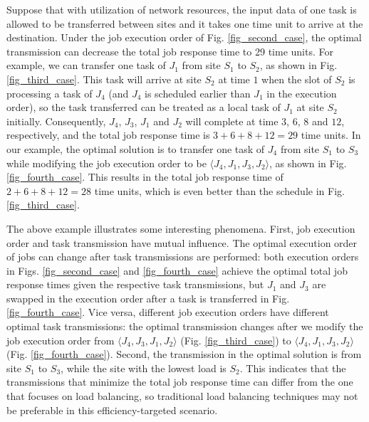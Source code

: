 Suppose that with utilization of network resources, the input data of one task is allowed to be transferred between sites and it takes one time unit to arrive at the destination. Under the job execution order of Fig. \ref{fig_second_case}, the optimal transmission can decrease the total job response time to 29 time units. For example, we can transfer one task of $J_1$ from site $S_1$ to $S_2$, as shown in Fig. \ref{fig_third_case}. This task will arrive at site $S_2$ at time $1$ when the slot of $S_2$ is processing a task of $J_4$ (and $J_4$ is scheduled earlier than $J_1$ in the execution order), so the task transferred can be treated as a local task of $J_1$ at site $S_2$ initially. Consequently, $J_4$, $J_3$, $J_1$ and $J_2$ will complete at time $3$, $6$, $8$ and $12$, respectively, and the total job response time is $3+6+8+12=29$ time units. In our example, the optimal solution is to transfer one task of $J_4$ from site $S_1$ to $S_3$ while modifying the job execution order to be $\langle J_4, J_1, J_3, J_2 \rangle$, as shown in Fig. \ref{fig_fourth_case}. This results in the total job response time of $2+6+8+12=28$ time units, which is even better than the schedule in Fig. \ref{fig_third_case}.

The above example illustrates some interesting phenomena. First, job execution order and task transmission have mutual influence. The optimal execution order of jobs can change after task transmissions are performed: both execution orders in Figs. \ref{fig_second_case} and \ref{fig_fourth_case} achieve the optimal total job response times given the respective task transmissions, but $J_1$ and $J_3$ are swapped in the execution order after a task is transferred in Fig. \ref{fig_fourth_case}. Vice versa, different job execution orders have different optimal task transmissions: the optimal transmission changes after we modify the job execution order from $\langle J_4, J_3, J_1, J_2 \rangle$ (Fig. \ref{fig_third_case}) to $\langle J_4, J_1, J_3, J_2 \rangle$ (Fig. \ref{fig_fourth_case}). Second, the transmission in the optimal solution is from site $S_1$ to $S_3$, while the site with the lowest load is $S_2$. This indicates that the transmissions that minimize the total job response time can differ from the one that focuses on load balancing, so traditional load balancing techniques may not be preferable in this efficiency-targeted scenario.


